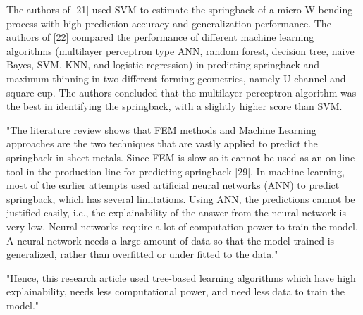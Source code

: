 The authors of [21] used SVM to estimate the springback of a micro W-bending process with high prediction accuracy and generalization performance. The authors of [22] compared the performance of different machine learning algorithms (multilayer perceptron type ANN, random forest, decision tree, naive Bayes, SVM, KNN, and logistic regression) in predicting springback and maximum thinning in two different forming geometries, namely U-channel and square cup. The authors concluded that the multilayer perceptron algorithm was the best in identifying the springback, with a slightly higher score than SVM.
\cite{cruz_applicationmachinelearning_2021}


"The literature review shows that FEM methods and Machine Learning approaches are the two techniques that are vastly applied to predict the springback in sheet metals. Since FEM is slow so it cannot be used as an on-line tool in the production line for predicting springback [29]. In machine learning, most of the earlier attempts used artificial neural networks (ANN) to predict springback, which has several limitations. Using ANN, the predictions cannot be justified easily, i.e., the explainability of the answer from the neural network is very low. Neural networks require a lot of computation power to train the model. A neural network needs a large amount of data so that the model trained is generalized, rather than overfitted or under fitted to the data."
\cite{baig_machinelearningprediction_2021}

"Hence, this research article used tree-based learning algorithms which have high explainability, needs less computational power, and need less data to train the model." 
\cite{baig_machinelearningprediction_2021}




